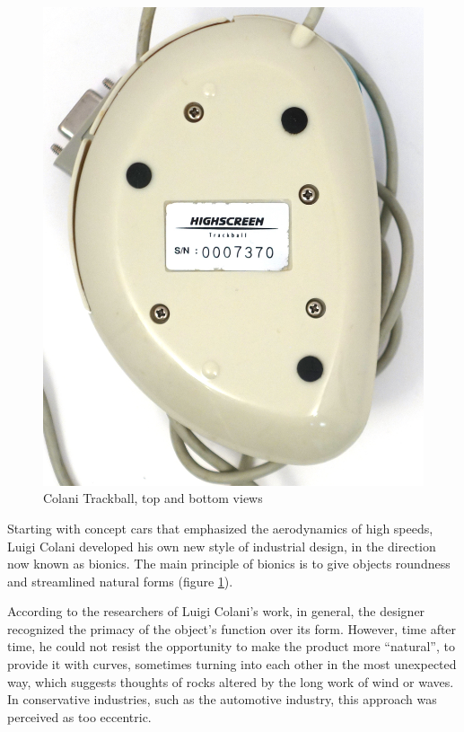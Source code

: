 \documentclass[11pt, a4paper]{article}
\begin{document}
\begin{figure}[h]
    \includegraphics[scale=0.39]{1993_colani_trackball/bottom_w_30.jpg}

    \caption{Colani Trackball, top and bottom views}
    \label{fig:ColaniTopBottom}
\end{figure}

Starting with concept cars that emphasized the aerodynamics of high speeds, Luigi Colani developed his own new style of industrial design, in the direction now known as bionics. The main principle of bionics is to give objects roundness and streamlined natural forms (figure \ref{fig:ColaniTopBottom}).

{According to the researchers of Luigi Colani's work, in general, the designer recognized the primacy of the object's function over its form. However, time after time, he could not resist the opportunity to make the product more “natural”, to provide it with curves, sometimes turning into each other in the most unexpected way, which suggests thoughts of rocks altered by the long work of wind or waves. In conservative industries, such as the automotive industry, this approach was perceived as too eccentric.}
\end{document}
